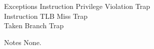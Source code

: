 \begin{iPageDescEntry}{Exceptions}{
  Instruction Privilege Violation Trap \\
  Instruction TLB Miss Trap \\
  Taken Branch Trap
}
\end{iPageDescEntry}

\begin{iPageDescEntry}{Notes}{
  None.
}
\end{iPageDescEntry}

